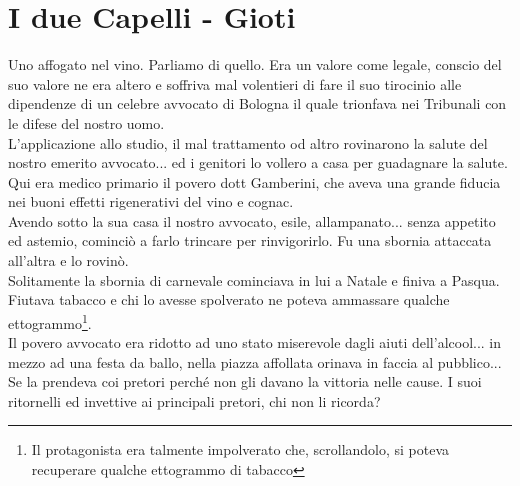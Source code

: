 \documentclass[10pt]{memoir} %
\begin{document}
\chapter{I due Capelli - Gioti}
Uno affogato nel vino. Parliamo di quello. Era un valore come legale, conscio del suo valore ne era altero e soffriva mal volentieri di fare il suo tirocinio alle dipendenze di un celebre avvocato di Bologna il quale trionfava nei Tribunali con le difese del nostro uomo.\\
L'applicazione allo studio, il mal trattamento od altro rovinarono la salute del nostro emerito avvocato... ed i genitori lo vollero a casa per guadagnare la salute.\\
Qui era medico primario il povero dott Gamberini, che aveva una grande fiducia nei buoni effetti rigenerativi del vino e cognac.\\
Avendo sotto la sua casa il nostro avvocato, esile, allampanato... senza appetito ed astemio, cominciò a farlo trincare per rinvigorirlo. Fu una sbornia attaccata all'altra e lo rovinò.\\
Solitamente la sbornia di carnevale cominciava in lui a Natale e finiva a Pasqua. Fiutava tabacco e chi lo avesse spolverato ne poteva ammassare qualche ettogrammo\footnote{Il protagonista era talmente impolverato che, scrollandolo, si poteva recuperare qualche ettogrammo di tabacco}.\\
Il povero avvocato era ridotto ad uno stato miserevole dagli aiuti dell'alcool... in mezzo ad una festa da ballo, nella piazza affollata orinava in faccia al pubblico...\\
Se la prendeva coi pretori perché non gli davano la vittoria nelle cause. I suoi ritornelli ed invettive ai principali pretori, chi non li ricorda?
\end{document}
